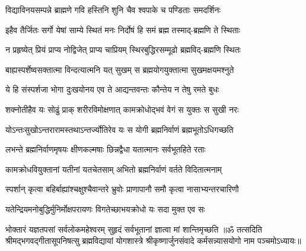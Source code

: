 \twolineshloka
{विद्याविनयसम्पन्ने ब्राह्मणे गवि हस्तिनि}
{शुनि चैव श्वपाके च पण्डिताः समदर्शिनः}%

\twolineshloka
{इहैव तैर्जितः सर्गो येषां साम्ये स्थितं मनः}
{निर्दोषं हि समं ब्रह्म तस्माद्-ब्रह्मणि ते स्थिताः}%

\twolineshloka
{न प्रहृष्येत् प्रियं प्राप्य नोद्विजेत् प्राप्य चाप्रियम्}
{स्थिरबुद्धिरसम्मूढो ब्रह्मविद्-ब्रह्मणि स्थितः}%

\twolineshloka
{बाह्यस्पर्शेष्वसक्तात्मा विन्दत्यात्मनि यत् सुखम्}
{स ब्रह्मयोगयुक्तात्मा सुखमक्षयमश्नुते}%

\twolineshloka
{ये हि संस्पर्शजा भोगा दुःखयोनय एव ते}
{आद्यन्तवन्तः कौन्तेय न तेषु रमते बुधः}%

\twolineshloka
{शक्नोतीहैव यः सोढुं प्राक् शरीरविमोक्षणात्}
{कामक्रोधोद्भवं वेगं स युक्तः स सुखी नरः}%

\twolineshloka
{योऽन्तःसुखोऽन्तरारामस्तथाऽन्तर्ज्योतिरेव यः}
{स योगी ब्रह्मनिर्वाणं ब्रह्मभूतोऽधिगच्छति}%

\twolineshloka
{लभन्ते ब्रह्मनिर्वाणमृषयः क्षीणकल्मषाः}
{छिन्नद्वैधा यतात्मानः सर्वभूतहिते रताः}%

\twolineshloka
{कामक्रोधवियुक्तानां यतीनां यतचेतसाम्}
{अभितो ब्रह्मनिर्वाणं वर्तते विदितात्मनाम्}%

\twolineshloka
{स्पर्शान् कृत्वा बहिर्बाह्यांश्चक्षुश्चैवान्तरे भ्रुवोः}
{प्राणापानौ समौ कृत्वा नासाभ्यन्तरचारिणौ}%

\twolineshloka
{यतेन्द्रियमनोबुद्धिर्मुनिर्मोक्षपरायणः}
{विगतेच्छाभयक्रोधो यः सदा मुक्त एव सः}%

\twolineshloka
{भोक्तारं यज्ञतपसां सर्वलोकमहेश्वरम्}
{सुहृदं सर्वभूतानां ज्ञात्वा मां शान्तिमृच्छति}%
{॥ॐ तत्सदिति श्रीमद्भगवद्गीतासूपनिषत्सु ब्रह्मविद्यायां योगशास्त्रे श्रीकृष्णार्जुनसंवादे कर्मसन्न्यासयोगो नाम पञ्चमोऽध्यायः॥}